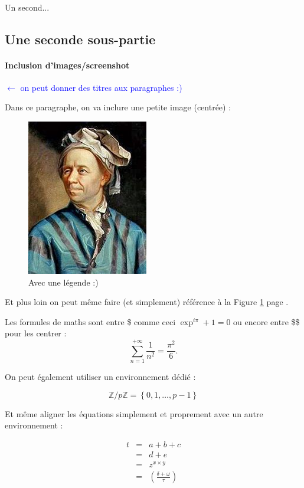 \documentclass[a4paper, 12pt]{article}
\begin{document}
\paragraph{}
Un second...

\subsection{Une seconde sous-partie}
\paragraph{Inclusion d'images/screenshot} \textcolor{blue}{$\leftarrow$ on peut donner des titres aux paragraphes :)} 

Dans ce paragraphe, on va inclure une petite image (centrée) :

\begin{figure}[h]
\centering
\includegraphics[scale=.5]{images/euler.jpg}
\caption{\label{euler}Avec une légende :)}
\end{figure}

Et plus loin on peut même faire (et simplement) référence à la Figure \ref{euler} page \pageref{euler}.

Les formules de maths sont entre \$ comme ceci $\exp^{i\pi} + 1 = 0$ ou encore entre \$\$ pour les centrer : $$\sum_{n=1}^{+\infty} \frac{1}{n^2} = \frac{\pi^2}{6}.$$

On peut également utiliser un environnement dédié :

\begin{equation}
\label{eq:zsurpz}
\mathbb{Z}/p\mathbb{Z} = \left\lbrace 0, 1, \ldots, p-1  \right\rbrace
\end{equation}

Et même aligner les équations simplement et proprement avec un autre environnement :

\begin{eqnarray}
t &=& a+b+c\\
&=& d+e \\
&=& z^{x\times y}\label{eq:ici}\\
&=& \left(\frac{\delta + \omega}{\tau}\right)
\end{eqnarray}
\end{document}
